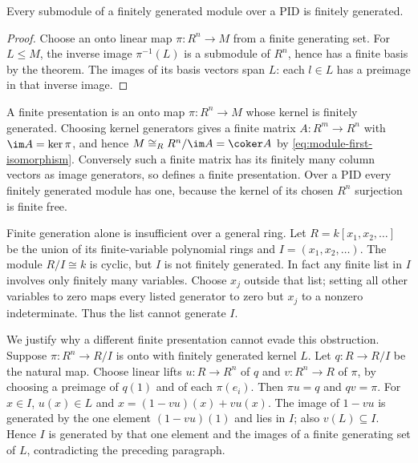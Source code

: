 \begin{corollary}\label{cor:pid-submodules-finite}
Every submodule of a finitely generated module over a PID is finitely
generated.
\end{corollary}
\begin{proof}
Choose an onto linear map $\pi:R^n\to M$ from a finite generating set.
For $L\le M$, the inverse image $\pi^{-1}(L)$ is a submodule of $R^n$,
hence has a finite basis by the theorem. The images of its basis vectors
span $L$: each $l\in L$ has a preimage in that inverse image.
\end{proof}

A finite presentation is an onto map $\pi:R^n\to M$ whose kernel is
finitely generated. Choosing kernel generators gives a finite matrix
$A:R^m\to R^n$ with $\im A=\ker\pi$, and hence
$M\cong_R R^n/\im A=\coker A$ by
\eqref{eq:module-first-isomorphism}. Conversely such a finite matrix
has its finitely many column vectors as image generators, so defines a
finite presentation. Over a PID every finitely generated module has
one, because the kernel of its chosen $R^n$ surjection is finite free.

Finite generation alone is insufficient over a general ring.
Let $R=k[x_1,x_2,\ldots]$ be the union of its finite-variable polynomial
rings and $I=(x_1,x_2,\ldots)$. The module $R/I\cong k$ is cyclic,
but $I$ is not finitely generated. In fact any finite list in $I$
involves only finitely many variables. Choose $x_j$ outside that list;
setting all other variables to zero maps every listed generator to zero
but $x_j$ to a nonzero indeterminate. Thus the list cannot generate $I$.

We justify why a different finite presentation cannot evade this
obstruction. Suppose $\pi:R^n\to R/I$ is onto with finitely generated
kernel $L$. Let $q:R\to R/I$ be the natural map.
Choose linear lifts $u:R\to R^n$ of $q$ and $v:R^n\to R$ of $\pi$,
by choosing a preimage of $q(1)$ and of each $\pi(e_i)$.
Then $\pi u=q$ and $qv=\pi$.
For $x\in I$, $u(x)\in L$ and
$x=(1-vu)(x)+vu(x)$.
The image of $1-vu$ is generated by the one element $(1-vu)(1)$
and lies in $I$; also $v(L)\subseteq I$.
Hence $I$ is generated by that one element and the images of a finite
generating set of $L$, contradicting the preceding paragraph.

